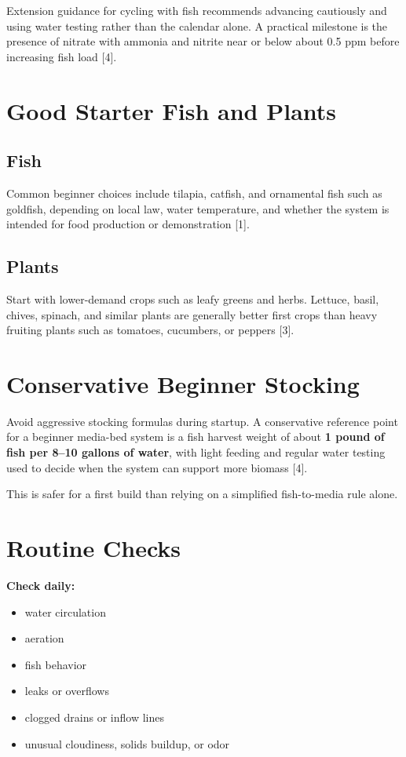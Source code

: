 \documentclass[11pt]{article}
\begin{document}
Extension guidance for cycling with fish recommends advancing cautiously and using water testing rather than the calendar alone. A practical milestone is the presence of nitrate with ammonia and nitrite near or below about 0.5 ppm before increasing fish load [4].

\section*{Good Starter Fish and Plants}
\subsection*{Fish}
Common beginner choices include tilapia, catfish, and ornamental fish such as goldfish, depending on local law, water temperature, and whether the system is intended for food production or demonstration [1].

\subsection*{Plants}
Start with lower-demand crops such as leafy greens and herbs. Lettuce, basil, chives, spinach, and similar plants are generally better first crops than heavy fruiting plants such as tomatoes, cucumbers, or peppers [3].

\section*{Conservative Beginner Stocking}
Avoid aggressive stocking formulas during startup. A conservative reference point for a beginner media-bed system is a fish harvest weight of about \textbf{1 pound of fish per 8--10 gallons of water}, with light feeding and regular water testing used to decide when the system can support more biomass [4].

This is safer for a first build than relying on a simplified fish-to-media rule alone.

\section*{Routine Checks}
\textbf{Check daily:}
\begin{itemize}
  \item water circulation
  \item aeration
  \item fish behavior
  \item leaks or overflows
  \item clogged drains or inflow lines
  \item unusual cloudiness, solids buildup, or odor
\end{itemize}
\end{document}
